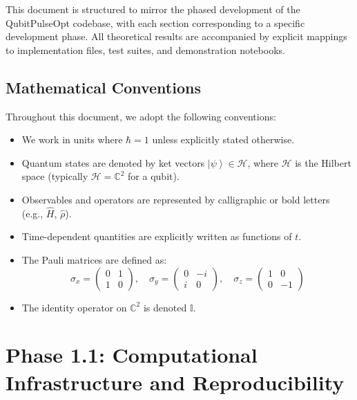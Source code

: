 \documentclass[11pt,a4paper]{article}
\theoremstyle{definition}
\theoremstyle{remark}
\newcommand{\ket}[1]{\left|#1\right\rangle}
\newcommand{\paulix}{\sigma_x}
\newcommand{\pauliy}{\sigma_y}
\newcommand{\pauliz}{\sigma_z}
\newcommand{\identity}{\mathbb{I}}
\newcommand{\hilbert}{\mathcal{H}}
\newcommand{\CC}{\mathbb{C}}
\begin{document}
This document is structured to mirror the phased development of the QubitPulseOpt codebase, with each section corresponding to a specific development phase. All theoretical results are accompanied by explicit mappings to implementation files, test suites, and demonstration notebooks.

\subsection{Mathematical Conventions}

Throughout this document, we adopt the following conventions:

\begin{itemize}
    \item We work in units where $\hbar = 1$ unless explicitly stated otherwise.
    \item Quantum states are denoted by ket vectors $\ket{\psi} \in \hilbert$, where $\hilbert$ is the Hilbert space (typically $\hilbert = \CC^2$ for a qubit).
    \item Observables and operators are represented by calligraphic or bold letters (e.g., $\hat{H}$, $\hat{\rho}$).
    \item Time-dependent quantities are explicitly written as functions of $t$.
    \item The Pauli matrices are defined as:
    \begin{equation}
    \paulix = \begin{pmatrix} 0 & 1 \\ 1 & 0 \end{pmatrix}, \quad
    \pauliy = \begin{pmatrix} 0 & -i \\ i & 0 \end{pmatrix}, \quad
    \pauliz = \begin{pmatrix} 1 & 0 \\ 0 & -1 \end{pmatrix}
    \end{equation}
    \item The identity operator on $\CC^2$ is denoted $\identity$.
\end{itemize}

\section{Phase 1.1: Computational Infrastructure and Reproducibility}
\label{sec:phase1.1}
\end{document}
